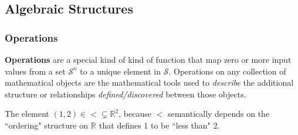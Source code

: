 \documentclass[11pt]{article} %
\newcommand\R[1]{\mathbb{R}^{#1}}
\renewcommand\S{\mathcal{S}}
\begin{document}
\subsection{Algebraic Structures}
\subsubsection{Operations}
\textbf{Operations} are a special kind of kind of function that map zero or more input values from a set $\S ^n$ to a unique element in $\S$. 
Operations on any collection of mathematical objects are the mathematical tools used to \textit{describe} the additional structure or relationships \textit{defined/discovered} between those objects. 

\example{}
{
The element $(1,2)\in \text{}< \text{}\subsetneq \R{2}$, because $<$ semantically depends on the ``ordering" structure on $\R{}$ that defines 1 to be ``less than" 2. 
}
\end{document}
